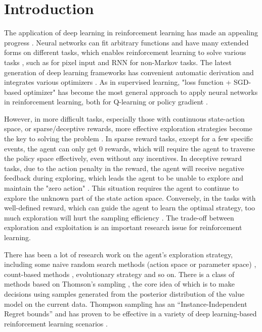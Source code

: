 \section{Introduction}
The application of deep learning in reinforcement learning has made an appealing progress \cite{DQN,AlphaGO,OpenAIdota}. Neural networks can fit arbitrary functions and have many extended forms on different tasks, which enables reinforcement learning to solve various tasks \cite{DQN,RN395}, such as  for pixel input and RNN for non-Markov tasks. The latest generation of deep learning frameworks has convenient automatic derivation and integrates various optimizers \cite{PyTorch,MXNet,TF}. As in supervised learning,  "loss function + SGD-based optimizer" has become the most general approach to apply neural networks in reinforcement learning, both for Q-learning or policy gradient \cite{DDPG,DQN,PPO}.

However, in more difficult tasks, especially those with continuous state-action space, or sparse/deceptive rewards, more effective exploration strategies become the key to solving the problem \cite{pnoise,colas2018gep}. In sparse reward tasks, except for a few specific events, the agent can only get 0 rewards, which will require the agent to traverse the policy space effectively, even without any incentives\cite{VIME}. In deceptive reward tasks, due to the action penalty in the reward, the agent will receive negative feedback during exploring, which leads the agent to be unable to explore and maintain the "zero action" \cite{lehman2011abandoning,conti2018improving}. This situation requires the agent to continue to explore the unknown part of the state action space. Conversely, in the tasks with well-defined reward, which can guide the agent to learn the optimal strategy, too much exploration will hurt the sampling efficiency \cite{Showdown}. The trade-off between exploration and exploitation is an important research issue for reinforcement learning.

There has been a lot of research work on the agent's exploration strategy, including some naive random search methods (action space or parameter space) \cite{pnoise,DDPG}, count-based methods \cite{count1,count2}, evolutionary strategy \cite{EPGRL,ERL2} and so on. There is a class of methods based on Thomson's sampling \cite{TS}, the core idea of which is to make decisions using samples generated from the posterior distribution of the value model on the current data. Thompson sampling has an “Instance-Independent Regret bounds” \cite{TStutorial} and has proven to be effective in a variety of deep learning-based reinforcement learning scenarios \cite{BDQN,VIME,dropoutInference,lastLayerBayes}.

